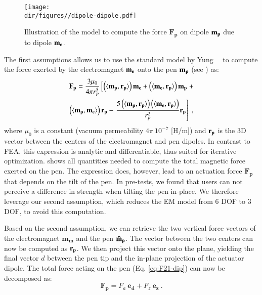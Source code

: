 %
\begin{figure}[!t]
    \centering
    \texttt{[image: \\dir/figures//dipole-dipole.pdf]} \\
    \caption{Illustration of the model to compute the force $\mathbf{F_p}$ on dipole $\mathbf{m_p}$ due to dipole $\mathbf{m_e}$. }
    \label{fig:dipole_dipole}
    \vspace{-1em}
\end{figure}

The first assumptions allows us to use the standard model by Yung~\etal~\cite{yung1998analytic} to compute the force exerted by the electromagnet $\mathbf{m_e}$ onto the pen $\mathbf{m_p}$ (see ) as:
%
\begin{multline}
   \mathbf{F_p} = {\dfrac  {3\mu _{0}}{4\pi r_{p}^{5}}}
   \left [ \left(\langle\mathbf{m_p},\mathbf{r_{p}}\rangle \right) \mathbf{m_e} + 
   \left(\langle\mathbf{m_e},\mathbf{r_{p}}\rangle\right) \mathbf{m_p} \right . +
   \\
   \left(\langle\mathbf{m_p},\mathbf{m_e}\rangle\right) \mathbf{r_{p}} - 
    \left . {\dfrac{5\left(\langle\mathbf{m_p},\mathbf{r_{p}}\rangle\right)
    \left(\langle\mathbf{m_e},\mathbf{r_{p}}\rangle\right)}{r_{p}^{2}}} \mathbf{r_{p}} \right ] \ , \label{eq:F21-dip}
\end{multline}
%
where $\mu_0$ is a constant (vacuum permeability $4\pi \ 10^{-7}$ [H/m]) and  $\mathbf{r_{p}}$ is the 3D vector between the centers of the electromagnet and pen dipoles.
In contrast to FEA, this expression is analytic and differentiable, thus suited for iterative optimization.
 shows all quantities needed to compute the total magnetic force exerted on the pen.
The expression does, however, lead to an actuation force $\mathbf{F_p}$ that depends on the tilt of the pen.
In pre-tests, we found that users can not perceive a difference in strength when tilting the pen in-place.
We therefore leverage our second assumption, which reduces the EM model from 6 DOF to 3 DOF, to avoid this computation. 

Based on the second assumption, we can retrieve the two vertical force vectors of the electromagnet $\mathbf{m_m}$ and the pen $\mathbf{\Tilde{m}_{p}}$.
The vector between the two centers can now be computed as $\mathbf{r_{p}}$.
We then project this vector onto the plane, yielding the final vector $d$ between the pen tip and the in-plane projection of the actuator dipole.
The total force acting on the pen (Eq. \ref{eq:F21-dip}) can now be decomposed as:
\begin{equation}
    \mathbf{F_p} = F_a \ \mathbf{e_d} + F_z  \ \mathbf{e_z} \ . \label{eq:Fp_decomp}
\end{equation}

